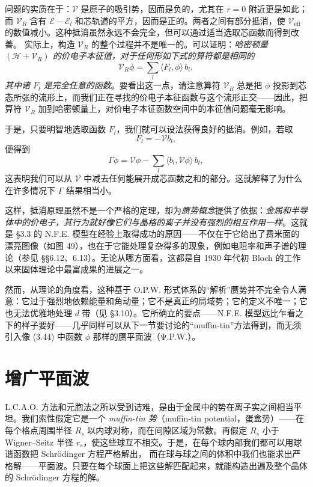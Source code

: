 问题的实质在于：$\mathcal{V}$ 是原子的吸引势，因而是负的，尤其在 $r=0$ 附近更是如此；而 $\mathcal{V}_R$ 含有 $\mathcal{E}-\mathcal{E}_l$ 和芯轨道的平方，因而是正的。两者之间有部分抵消，使 $\mathcal{V}_{\mathrm{eff}}$ 的数值减小。这种抵消虽然永远不会完全，但可以通过适当选取芯函数而得到改善。
实际上，构造 $\mathcal{V}_R$ 的整个过程并不是唯一的。可以证明：\emph{哈密顿量 $(\mathcal{H}+\mathcal{V}_R)$ 的价电子本征值，对于任何形如下式的算符都是相同的}
\begin{equation*}
\mathcal{V}_R\phi=\sum_l\langle F_l,\phi\rangle\,b_l,\tag{3.56}
\end{equation*}
\emph{其中诸 $F_l$ 是完全任意的函数}。要看出这一点，请注意算符 $\mathcal{V}_R$ 总是把 $\phi$ 投影到芯态所张的流形上，而我们正在寻找的价电子本征函数与这个流形正交——因此，把算符 $\mathcal{V}_R$ 加到哈密顿量上，对价电子本征函数空间中的本征值问题毫无影响。

于是，只要明智地选取函数 $F_l$，我们就可以设法获得良好的抵消。例如，若取
\begin{equation*}
F_l=-\mathcal{V}b_l,\tag{3.57}
\end{equation*}
便得到
\begin{equation*}
\Gamma\phi=\mathcal{V}\phi-\sum_l\langle b_l,\mathcal{V}\phi\rangle\,b_l,\tag{3.58}
\end{equation*}
这表明我们可以从 $\mathcal{V}$ 中减去任何能展开成芯函数之和的部分。这就解释了为什么在许多情况下 $\Gamma$ 结果相当小。

这样，抵消原理虽然不是一个严格的定理，却为\emph{赝势概念}提供了依据：\emph{金属和半导体中的价电子，其行为就好像它们与晶格的离子并没有强烈的相互作用一样}。这就是 §3.3 的 N.F.E. 模型在经验上取得成功的原因——不仅在于它给出了费米面的漂亮图像（如图 49），也在于它能处理复杂得多的现象，例如电阻率和声子谱的理论（参见 §§6.12、6.13）。无论从哪方面看，这都是自 1930 年代初 Bloch 的工作以来固体理论中最富成果的进展之一。

然而，从理论的角度看，这种基于 O.P.W. 形式体系的“解析”赝势并不完全令人满意：它过于强烈地依赖能量和角动量；它不是真正的局域势；它的定义不唯一；它也无法优雅地处理 $d$ 带（见 §3.10）。它所确立的要点——N.F.E. 模型远比乍看之下的样子要好——几乎同样可以从下一节要讨论的“muffin-tin”方法得到，而无须引入像 (3.44) 中函数 $\phi$ 那样的赝平面波（Ψ.P.W.）。

\section{增广平面波}

L.C.A.O. 方法和元胞法之所以受到诘难，是由于金属中的势在离子实之间相当平坦。我们索性假定它是一个 \emph{muffin-tin 势}（muffin-tin potential，蛋盒势）——在每个格点周围半径 $R_s$ 以内球对称，而在间隙区域为常数。再假定 $R_s$ 小于 Wigner--Seitz 半径 $r_s$，使这些球互不相交。于是，在每个球内部我们都可以用球谐函数把 Schrödinger 方程严格解出，
而在球与球之间的体积中我们也能求出严格解——平面波。只要在每个球面上把这些解匹配起来，就能构造出遍及整个晶体的 Schrödinger 方程的解。

